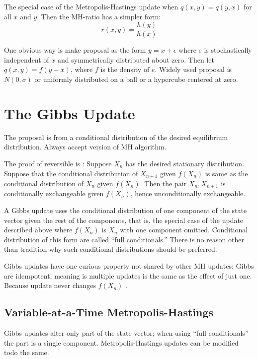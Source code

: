 \documentclass[
]{book}
\theoremstyle{definition}
\theoremstyle{definition}
\theoremstyle{definition}
\theoremstyle{remark}
\begin{document}
The special case of the Metropolis-Hastings update when \(q(x,y)=q(y,x)\) for all \(x\) and \(y\). Then the MH-ratio has a simpler form:
\[
r(x,y)=\frac{h(y)}{h(x)}
\]

One obvious way is make proposal as the form \(y=x+\epsilon\) where e is stochastically independent of \(x\) and symmetrically distributed about zero. Then let \(q(x,y)=f(y-x)\), where \(f\) is the density of \(e\). Widely used proposal is \(N(0,\sigma)\) or uniformly distributed on a ball or a hypercube centered at zero.

\hypertarget{the-gibbs-update}{%
\section{The Gibbs Update}\label{the-gibbs-update}}

The proposal is from a conditional distribution of the desired equilibrium distribution. Always accept version of MH algorithm.

The proof of reversible is :
Suppose \(X_n\) has the desired stationary distribution. Suppose that the conditional distribution of \(X_{n+1}\) given \(f(X_n)\) is same as the conditional distribution of \(X_n\) given \(f(X_n)\). Then the pair \(X_n,X_{n+1}\) is conditionally exchangeable given \(f(X_n)\), hence unconditionally exchangeable.

A Gibbs update uses the conditional distribution of one component of the state vector given the rest of the components, that is, the special case of the update described above where \(f(X_n)\) is \(X_n\) with one component omitted. Conditional distribution of this form are called ``full conditionals.'' There is no reason other than tradition why such conditional distributions should be preferred.

Gibbs updates have one curious property not shared by other MH updates: Gibbs are idempotent, meaning is multiple updates is the same as the effect of just one. Because update never changes \(f(X_n)\) .

\hypertarget{variable-at-a-time-metropolis-hastings}{%
\subsection{Variable-at-a-Time Metropolis-Hastings}\label{variable-at-a-time-metropolis-hastings}}

Gibbs updates alter only part of the state vector; when using ``full conditionals'' the part is a single component. Metropolis-Hastings updates can be modified todo the same.
\end{document}
